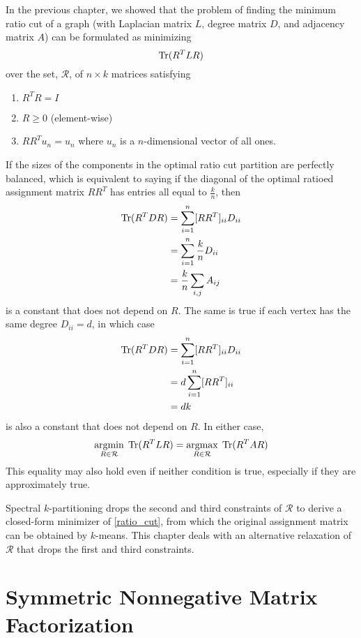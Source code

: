 In the previous chapter, we showed that the problem of finding the
minimum ratio cut of a graph (with Laplacian matrix $L$, degree matrix
$D$, and adjacency matrix $A$) can be formulated as minimizing
\begin{equation} \label{ratio_cut}
\operatorname{Tr}(R^T L R)
\end{equation}
over the set, $\mathcal{R}$, of $n \times k$ matrices satisfying
\begin{enumerate}
\item
$R^T R = I$

\item
$R \geq 0$ (element-wise)

\item
$R R^T u_n = u_n$ where $u_n$ is a $n$-dimensional vector of all ones.
\end{enumerate}

If the sizes of the components in the optimal ratio cut partition
are perfectly balanced, which is equivalent to saying if the diagonal
of the optimal ratioed assignment matrix $R R^T$ has entries all
equal to $\frac{k}{n}$, then
\begin{align*}
\operatorname{Tr}(R^T D R) &= \sum_{i=1}^n [R R^T]_{ii} D_{ii} \\
             &= \sum_{i=1}^n \frac{k}{n} D_{ii} \\
             &= \frac{k}{n} \sum_{i,j} A_{ij}
\end{align*}
is a constant that does not depend on $R$. The same is true if each
vertex has the same degree $D_{ii} = d$, in which case
\begin{align*}
\operatorname{Tr}(R^T D R) &= \sum_{i=1}^n [R R^T]_{ii} D_{ii} \\
             &= d \sum_{i=1}^n [R R^T]_{ii} \\ 
             &= d k
\end{align*}
is also a constant that does not depend on $R$. In either case,
\[ \underset{R \in \mathcal{R}}{\mathrm{arg min}}\; \operatorname{Tr}(R^T L R)
 = \underset{R \in \mathcal{R}}{\mathrm{arg max}}\; \operatorname{Tr}(R^T A R) \]
This equality may also hold even if neither condition is true,
especially if they are approximately true.

Spectral $k$-partitioning drops the second and third constraints
of $\mathcal{R}$ to derive a closed-form minimizer of \ref{ratio_cut},
from which the original assignment matrix can be obtained by $k$-means.
This chapter deals with an alternative relaxation of $\mathcal{R}$ that
drops the first and third constraints.

\section{Symmetric Nonnegative Matrix Factorization}

